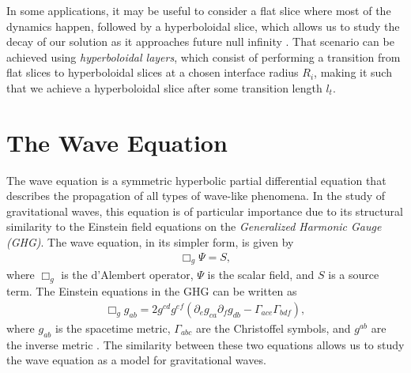 In some applications, it may be useful to consider a flat slice where most of the dynamics happen, followed by a hyperboloidal slice, which allows us to study the decay of our solution as it approaches future null infinity \cite{Hyperboloidal_layers_for_hyperbolic_equations_on_unbounded_domains,The_evolution_of_hyperboloidal_data_with_the_dual_foliation_formalism_Mathematical_analysis_and_wave_equation_tests}. That scenario can be achieved using \textit{hyperboloidal layers}, which consist of performing a transition from flat slices to hyperboloidal slices at a chosen interface radius $R_i$, making it such that we achieve a hyperboloidal slice after some transition length $l_t$. 

\section{The Wave Equation}
\label{section:wave_equation}

The wave equation is a symmetric hyperbolic partial differential equation that describes the propagation of all types of wave-like phenomena. In the study of gravitational waves, this equation is of particular importance due to its structural similarity to the Einstein field equations on the \textit{Generalized Harmonic Gauge (GHG)}. The wave equation, in its simpler form, is given by
%
\begin{align}
    \Box_g \Psi = S,
    \label{eq:wave_equation_simple}
\end{align}
%
where $\Box_g$ is the d'Alembert operator, $\Psi$ is the scalar field, and $S$ is a source term. The Einstein equations in the GHG can be written as
%
\begin{align}
    \Box_g g_{ab} = 2 g^{cd} g^{ef} (\partial_e g_{ca} \partial_f g_{db} - \Gamma_{ace} \Gamma_{bdf}),
\end{align}
%
where $g_{ab}$ is the spacetime metric, $\Gamma_{abc}$ are the Christoffel symbols, and $g^{ab}$ are the inverse metric \cite{A_new_generalized_harmonic_evolution_system}. The similarity between these two equations allows us to study the wave equation as a model for gravitational waves.

